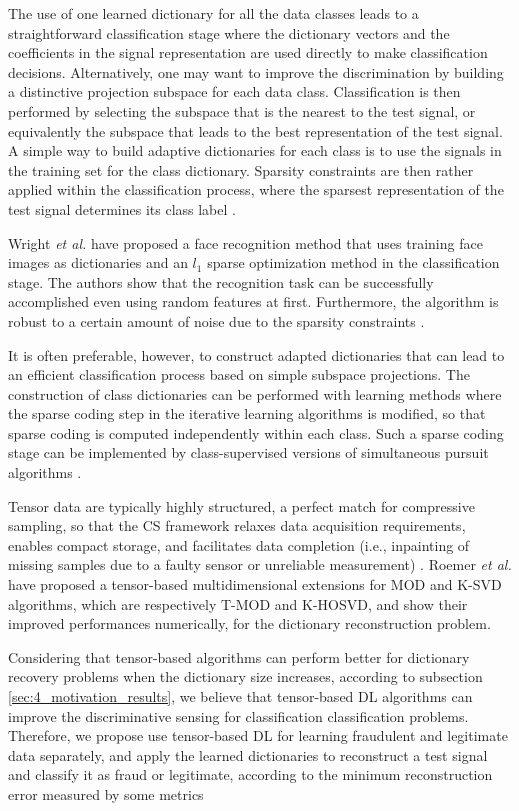 The use of one learned dictionary for all the data classes leads to a straightforward classification stage where the dictionary vectors and the coefficients in the signal representation are used directly to make classification decisions. Alternatively, one may want to improve the discrimination by building a distinctive projection subspace for each data class. Classification is then performed by selecting the subspace that is the nearest to the test signal, or equivalently the subspace that leads to the best representation of the test signal. A simple way to build adaptive dictionaries for each class is to use the signals in the training set for the class dictionary. Sparsity constraints are then rather applied within the classification process, where the sparsest representation of the test signal determines its class label \cite{tosic2011dictionary}.

Wright \emph{et al.} \cite{wright2009robust} have proposed a face recognition method that uses training face images as dictionaries and an $l_1$ sparse optimization method in the classification stage. The authors show that the recognition task can be successfully accomplished even using random features at first. Furthermore, the algorithm is robust to a certain amount of noise due to the sparsity constraints \cite{tosic2011dictionary}.

It is often preferable, however, to construct adapted dictionaries that can lead to an efficient classification process based on simple subspace projections. The construction of class dictionaries can be performed with learning methods where the sparse coding step in the iterative learning algorithms is modified, so that sparse coding is computed independently within each class. Such a sparse coding stage can be implemented by class-supervised versions of simultaneous pursuit algorithms \cite{tosic2011dictionary}.

Tensor data are typically highly structured, a perfect match for compressive sampling, so that the CS framework relaxes data acquisition requirements, enables compact storage, and facilitates data completion (i.e., inpainting of missing samples due to a faulty sensor or unreliable measurement) \cite{cichocki2015tensor}. Roemer \emph{et al.} \cite{roemer2014tensor} have proposed a tensor-based multidimensional extensions for MOD and K-SVD algorithms, which are respectively T-MOD and K-HOSVD, and show their improved performances numerically, for the dictionary reconstruction problem. 

Considering that tensor-based algorithms can perform better for dictionary recovery problems when the dictionary size increases, according to subsection \ref{sec:4_motivation_results}, we believe that tensor-based DL algorithms can improve the discriminative sensing for classification classification problems. Therefore, we propose use tensor-based DL for learning fraudulent and legitimate data separately, and apply the learned dictionaries to reconstruct a test signal and classify it as fraud or legitimate, according to the minimum reconstruction error measured by some metrics

